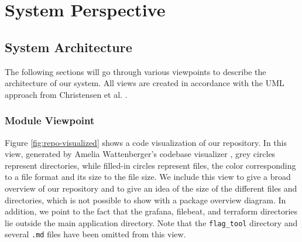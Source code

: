 \section{System Perspective}


\subsection{System Architecture}
The following sections will go through various viewpoints to describe the architecture of our system. All views are created in accordance with the UML approach from Christensen et al. \cite{christensen2016_uml}. 

\subsubsection{Module Viewpoint}

Figure \ref{fig:repo-visualized} shows a code visualization of our repository. In this view, generated by Amelia Wattenberger's codebase visualizer \cite{codebase_visualizer}, grey circles represent directories, while filled-in circles represent files, the color corresponding to a file format and its size to the file size. We include this view to give a broad overview of our repository and to give an idea of the size of the different files and directories, which is not possible to show with a package overview diagram. In addition, we point to the fact that the grafana, filebeat, and terraform directories lie outside the main application directory. Note that the \texttt{flag\_tool} directory and several \texttt{.md} files have been omitted from this view. \\

